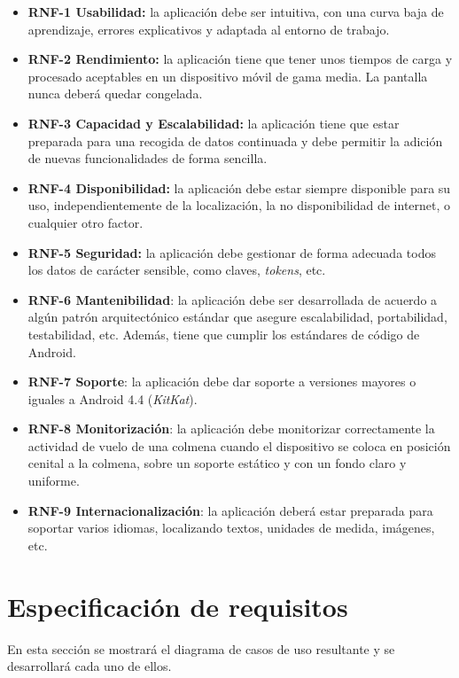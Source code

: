 \begin{itemize}
\tightlist
\item
  \textbf{RNF-1 Usabilidad:} la aplicación debe ser intuitiva, con una
  curva baja de aprendizaje, errores explicativos y adaptada al entorno
  de trabajo.
\item
  \textbf{RNF-2 Rendimiento:} la aplicación tiene que tener unos tiempos
  de carga y procesado aceptables en un dispositivo móvil de gama media.
  La pantalla nunca deberá quedar congelada.
\item
  \textbf{RNF-3 Capacidad y Escalabilidad:} la aplicación tiene que
  estar preparada para una recogida de datos continuada y debe permitir
  la adición de nuevas funcionalidades de forma sencilla.
\item
  \textbf{RNF-4 Disponibilidad:} la aplicación debe estar siempre
  disponible para su uso, independientemente de la localización, la no
  disponibilidad de internet, o cualquier otro factor.
\item
  \textbf{RNF-5 Seguridad:} la aplicación debe gestionar de forma
  adecuada todos los datos de carácter sensible, como claves,
  \emph{tokens}, etc.
\item
  \textbf{RNF-6 Mantenibilidad}: la aplicación debe ser desarrollada de
  acuerdo a algún patrón arquitectónico estándar que asegure
  escalabilidad, portabilidad, testabilidad, etc. Además, tiene que
  cumplir los estándares de código de Android.
\item
  \textbf{RNF-7 Soporte}: la aplicación debe dar soporte a versiones
  mayores o iguales a Android 4.4 (\emph{KitKat}).
\item
  \textbf{RNF-8 Monitorización}: la aplicación debe monitorizar
  correctamente la actividad de vuelo de una colmena cuando el
  dispositivo se coloca en posición cenital a la colmena, sobre un
  soporte estático y con un fondo claro y uniforme.
\item
  \textbf{RNF-9 Internacionalización}: la aplicación deberá estar
  preparada para soportar varios idiomas, localizando textos, unidades
  de medida, imágenes, etc.
\end{itemize}

\section{Especificación de
requisitos}\label{especificacion-de-requisitos-1}

En esta sección se mostrará el diagrama de casos de uso resultante y se
desarrollará cada uno de ellos.

